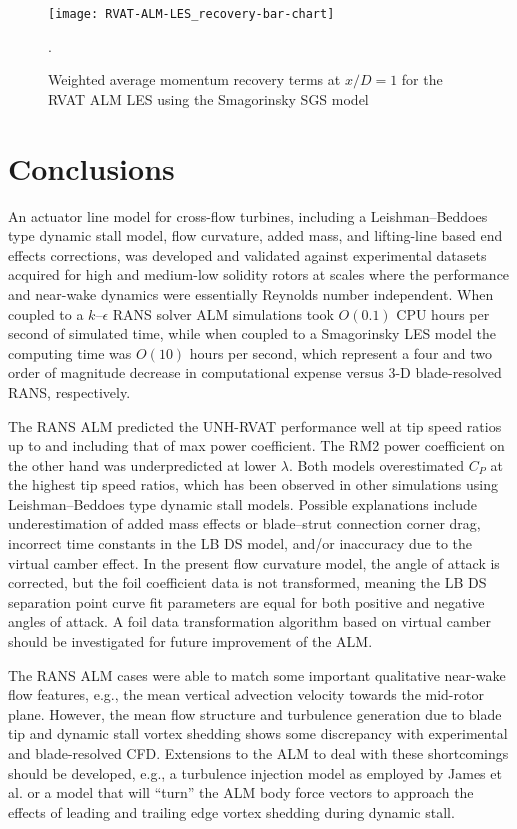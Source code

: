 \begin{figure}
    \centering

    \texttt{[image: RVAT-ALM-LES\_recovery-bar-chart]}

    \caption{Weighted average momentum recovery terms at $x/D=1$ for the RVAT
        ALM LES using the Smagorinsky SGS model}.

    \label{fig:RVAT-ALM-LES-recovery}
\end{figure}


\section{Conclusions}

An actuator line model for cross-flow turbines, including a Leishman--Beddoes
type dynamic stall model, flow curvature, added mass, and lifting-line based end
effects corrections, was developed and validated against experimental datasets
acquired for high and medium-low solidity rotors at scales where the performance
and near-wake dynamics were essentially Reynolds number independent. When
coupled to a $k$--$\epsilon$ RANS solver ALM simulations took $O(0.1)$ CPU hours
per second of simulated time, while when coupled to a Smagorinsky LES model the
computing time was $O(10)$ hours per second, which represent a four and two
order of magnitude decrease in computational expense versus 3-D blade-resolved
RANS, respectively.

The RANS ALM predicted the UNH-RVAT performance well at tip speed ratios up to
and including that of max power coefficient. The RM2 power coefficient on the
other hand was underpredicted at lower $\lambda$. Both models overestimated
$C_P$ at the highest tip speed ratios, which has been observed in other
simulations using Leishman--Beddoes type dynamic stall models. Possible
explanations include underestimation of added mass effects or blade--strut
connection corner drag, incorrect time constants in the LB DS model, and/or
inaccuracy due to the virtual camber effect. In the present flow curvature
model, the angle of attack is corrected, but the foil coefficient data is not
transformed, meaning the LB DS separation point curve fit parameters are equal
for both positive and negative angles of attack. A foil data transformation
algorithm based on virtual camber should be investigated for future improvement
of the ALM.

The RANS ALM cases were able to match some important qualitative near-wake flow
features, e.g., the mean vertical advection velocity towards the mid-rotor
plane. However, the mean flow structure and turbulence generation due to blade
tip and dynamic stall vortex shedding shows some discrepancy with experimental
and blade-resolved CFD. Extensions to the ALM to deal with these shortcomings
should be developed, e.g., a turbulence injection model as employed by James et
al. \cite{James2010} or a model that will ``turn'' the ALM body force vectors to
approach the effects of leading and trailing edge vortex shedding during dynamic
stall.

